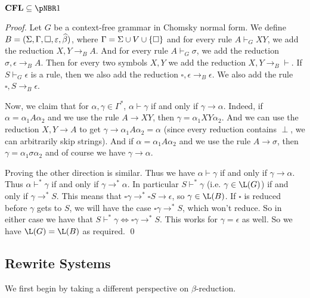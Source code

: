 \documentclass{llncs}
\begin{document}
\begin{theorem}

    $\CFL\subseteq\pNBR1$

\end{theorem}

\begin{proof}

    Let $G$ be a context-free grammar in Chomsky normal form.
    We define $B=(\Sigma,\Gamma,\square,\varepsilon,\widehat\beta)$, where $\Gamma=\Sigma\cup V\cup\set\square$ and for every rule
    $A\vdash_GXY$, we add the reduction $X,Y\to_BA$.
    And for every rule $A\vdash_G\sigma$, we add the reduction $\sigma,\epsilon\to_BA$.
    Then for every two symbols $X,Y$ we add the reduction $X,Y\to_B\vdash$.
    If $S\vdash_G\epsilon$ is a rule, then we also add the reduction $\square,\epsilon\to_B\epsilon$.
    We also add the rule $\square,S\to_B\epsilon$.

    Now, we claim that for $\alpha,\gamma\in\Gamma^*$, $\alpha\vdash\gamma$ if and only if $\gamma\to\alpha$.
    Indeed, if $\alpha=\alpha_1A\alpha_2$ and we use the rule $A\to XY$, then $\gamma=\alpha_1XY\alpha_2$.
    And we can use the reduction $X,Y\to A$ to get $\gamma\to\alpha_1A\alpha_2=\alpha$ (since every reduction contains $\perp$,
    we can arbitrarily skip strings).
    And if $\alpha=\alpha_1A\alpha_2$ and we use the rule $A\to\sigma$, then $\gamma=\alpha_1\sigma\alpha_2$ and of course we
    have $\gamma\to\alpha$.

    Proving the other direction is similar.
    Thus we have $\alpha\vdash\gamma$ if and only if $\gamma\to\alpha$.
    Thus $\alpha\vdash^*\gamma$ if and only if $\gamma\to^*\alpha$.
    In particular $S\vdash^*\gamma$ (i.e. $\gamma\in\L(G)$) if and only if $\gamma\to^*S$.
    This means that $\square\gamma\to^*\square S\to\epsilon$, so $\gamma\in\L(B)$.
    If $\square$ is reduced before $\gamma$ gets to $S$, we will have the case $\square\gamma\to^*S$, which won't reduce.
    So in either case we have that $S\vdash^*\gamma\iff\square\gamma\to^*S$.
    This works for $\gamma=\epsilon$ as well.
    So we have $\L(G)=\L(B)$ as required.
    \qed

\end{proof}

\subsection{Rewrite Systems}

We first begin by taking a different perspective on $\beta$-reduction.
\end{document}
